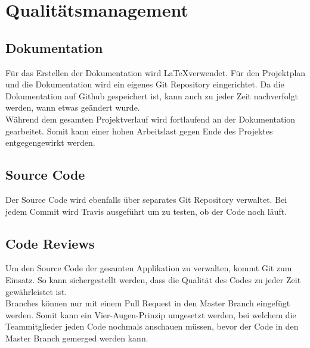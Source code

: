 \section{Qualitätsmanagement}
\subsection{Dokumentation}
Für das Erstellen der Dokumentation wird \LaTeX verwendet. Für den Projektplan und die Dokumentation wird ein eigenes Git Repository eingerichtet. Da die Dokumentation auf Github gespeichert ist, kann auch zu jeder Zeit nachverfolgt werden, wann etwas geändert wurde. \\
Während dem gesamten Projektverlauf wird fortlaufend an der Dokumentation gearbeitet. Somit kann einer hohen Arbeitslast gegen Ende des Projektes entgegengewirkt werden.

\subsection{Source Code}
Der Source Code wird ebenfalls über separates Git Repository verwaltet. Bei jedem Commit wird Travis ausgeführt um zu testen, ob der Code noch läuft.

\subsection{Code Reviews}
Um den Source Code der gesamten Applikation zu verwalten, kommt Git zum Einsatz. So kann sichergestellt werden, dass die Qualität des Codes zu jeder Zeit gewährleistet ist.\\
Branches können nur mit einem Pull Request in den Master Branch eingefügt werden. Somit kann ein Vier-Augen-Prinzip umgesetzt werden, bei welchem die Teammitglieder jeden Code nochmals anschauen müssen, bevor der Code in den Master Branch gemerged werden kann.

\newpage